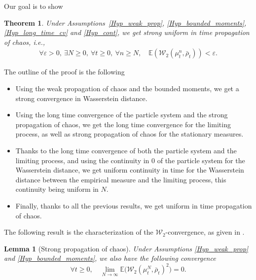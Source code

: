 \documentclass[11pt]{article}
\newcommand{\ie}{i.e.,\xspace}
\let\epsilon\varepsilon
\theoremstyle{plain}
\newtheorem{theorem}{Theorem}
\newtheorem{lemma}{Lemma}[section]
\theoremstyle{definition}
\begin{document}
Our goal is to show
\begin{theorem}\label{unif_prop_chaos_a_partir_de_tout_un_tas_de_proprietes_que_je_ne_vais_pas_donner_parce_que_la_reference_devient_trop_longue_mais_vous_voyez_l_idee}
Under Assumptions~\ref{Hyp_weak_prop}, \ref{Hyp_bounded_moments}, \ref{Hyp_long_time_cv} and \ref{Hyp_cont}, we get strong uniform in time propagation of chaos, \ie
\begin{align*}
\forall \epsilon>0,\ \exists N\geq0,\ \forall t\geq0,\ \forall n\geq N,\quad \mathbb{E}\left(\mathcal{W}_2\left(\mu^n_t,\bar{\rho}_t\right)\right)<\epsilon.
\end{align*}
\end{theorem}

The outline of the proof is the following
\begin{itemize}
\item Using the weak propagation of chaos and the bounded moments, we get a strong convergence in Wasserstein distance.
\item Using the long time convergence of the particle system and the strong propagation of chaos, we get the long time convergence for the limiting process, as well as strong propagation of chaos for the stationary measures.
\item Thanks to the long time convergence of both the particle system and the limiting process, and using the continuity in $0$ of the particle system for the Wasserstein distance, we get uniform continuity in time for the Wasserstein distance between the empirical measure and the limiting process, this continuity being uniform in $N$.
\item Finally, thanks to all the previous results, we get uniform in time propagation of chaos.
\end{itemize}

The following result is the characterization of the $\mathcal{W}_2$-convergence, as given in \cite[Th.\,6.9]{villani2008optimal}.

\begin{lemma}[Strong propagation of chaos]\label{strong_prop}
Under Assumptions \ref{Hyp_weak_prop} and \ref{Hyp_bounded_moments}, we also have the following convergence
\begin{equation}
\forall t\geq0,\quad \lim_{N\to\infty}\mathbb{E}\bigl(\mathcal{W}_2\left(\mu^N_t,\bar{\rho}_t\right)^2\bigr)=0.
\end{equation}
\end{lemma}
\end{document}
